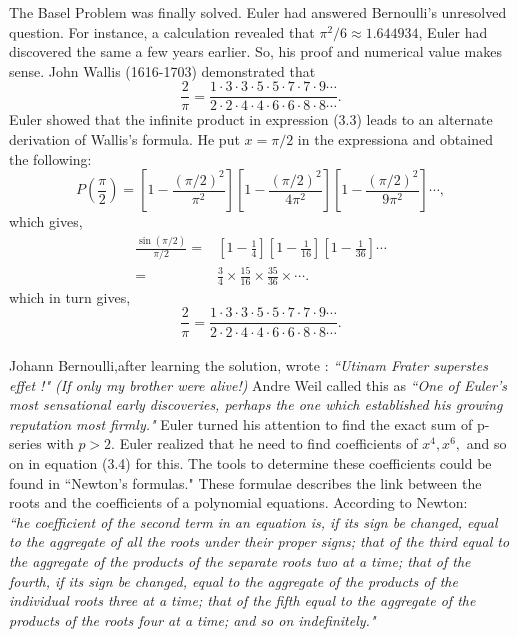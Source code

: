 \documentclass[a4paper,reqno,11pt]{book}
\theoremstyle{plain}%
\theoremstyle{definition}
\begin{document}
The Basel Problem was finally solved. Euler had answered Bernoulli's unresolved question. For instance, a calculation revealed that $\pi^2 /6 \approx 1.644934$, Euler had discovered the same a few years earlier. So, his proof and numerical value makes sense. John Wallis (1616-1703) demonstrated that\\
$$ \frac{2}{\pi} = \frac{1\cdot3\cdot3\cdot5\cdot5\cdot7\cdot7\cdot9\cdots}{2\cdot2\cdot4\cdot4\cdot6\cdot6\cdot8\cdot8\cdots}.$$
Euler showed that the infinite product in expression (3.3) leads to an 
alternate derivation of Wallis's formula. He put $x = \pi/2$ in the expressiona and obtained the following:
$$P\left(\frac{\pi}{2}\right) = \left[1 - \frac{(\pi/2)^2}{\pi^2}\right]\left[1 - \frac{(\pi/2)^2}{4\pi^2}\right]\left[1 - \frac{(\pi/2)^2}{9\pi^2}\right]\cdots,$$
which gives,\\
\begin{align*}
\frac{\sin(\pi/2)}{\pi/2} =& \left[1-\frac{1}{4}\right]\left[1-\frac{1}{16}\right]\left[1-\frac{1}{36}\right]\cdots\\
=&  \frac{3}{4} \times \frac{15}{16} \times \frac{35}{36} \times \cdots.
\end{align*}
which in  turn gives,
$$ \frac{2}{\pi} = \frac{1\cdot3\cdot3\cdot5\cdot5\cdot7\cdot7\cdot9\cdots}{2\cdot2\cdot4\cdot4\cdot6\cdot6\cdot8\cdot8\cdots}.$$
\\
Johann Bernoulli,after learning the solution, wrote : \textit{``Utinam Frater superstes effet !" (If only my brother were alive!)}
Andre Weil called this as \textit{``One of Euler's most sensational early discoveries, perhaps the one which established his growing reputation most firmly."} Euler turned his attention to find the exact sum of p-series 
with $p > 2$. Euler realized that he need to find coefficients of $x^4, x^6,$ and so on in equation (3.4) for this. The tools to determine these coefficients could be found in ``Newton's formulas." These formulae describes the link between the roots and the coefficients of a polynomial equations. According to Newton:\\
\indent \textit{``he coefficient of the second term in an equation is, if its sign be changed, equal to the aggregate of all the roots under their proper 
signs; that of the third equal to the aggregate of the products of the 
separate roots two at a time; that of the fourth, if its sign be changed, 
equal to the aggregate of the products of the individual roots three at 
a time; that of the fifth equal to the aggregate of the products of the 
roots four at a time; and so on indefinitely."}\cite{ref 1}\\
\end{document}

